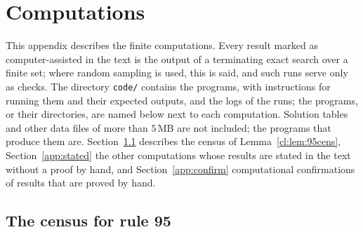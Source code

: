 \section{Computations}\label{app:comp}

This appendix describes the finite computations. Every result marked as computer-assisted in the text is the output of a terminating exact search over a finite set; where random sampling is used, this is said, and such runs serve only as checks. The directory \texttt{code/} contains the programs, with instructions for running them and their expected outputs, and the logs of the runs; the programs, or their directories, are named below next to each computation. Solution tables and other data files of more than $5$\,MB are not included; the programs that produce them are. Section~\ref{app:census} describes the census of Lemma~\ref{cl:lem:95cens}, Section~\ref{app:stated} the other computations whose results are stated in the text without a proof by hand, and Section~\ref{app:confirm} computational confirmations of results that are proved by hand.

\subsection{The census for rule 95}\label{app:census}

